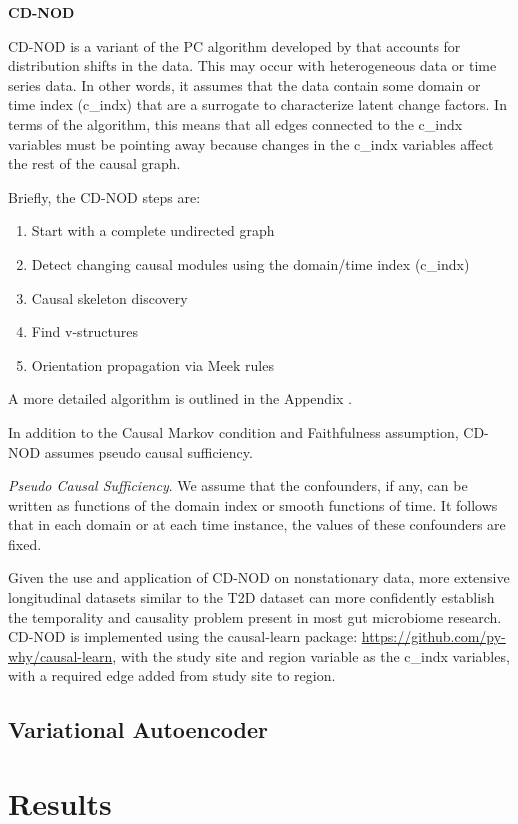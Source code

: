 \documentclass[12pt,letterpaper]{article}
\begin{document}
\textbf{CD-NOD}

CD-NOD is a variant of the PC algorithm developed by \citep{huang2019cdnod} that accounts for distribution shifts in the data. This may occur with heterogeneous data or time series data. In other words, it assumes that the data contain some domain or time index (c\_indx) that are a surrogate to characterize latent change factors. In terms of the algorithm, this means that all edges connected to the c\_indx variables must be pointing away because changes in the c\_indx variables affect the rest of the causal graph. 

Briefly, the CD-NOD steps are:
\begin{enumerate}
    \item Start with a complete undirected graph
    \item Detect changing causal modules using the domain/time index (c\_indx)
    \item Causal skeleton discovery
    \item Find v-structures
    \item Orientation propagation via Meek rules
\end{enumerate}

A more detailed algorithm is outlined in the Appendix \citep{huang2019cdnod}. 

In addition to the Causal Markov condition and Faithfulness assumption, CD-NOD assumes pseudo causal sufficiency.

\textit {Pseudo Causal Sufficiency}. We assume that the confounders, if any, can be written as functions of the domain index or smooth functions of time. It follows that in each domain or at each time instance, the values of these confounders are fixed. 

Given the use and application of CD-NOD on nonstationary data, more extensive longitudinal datasets similar to the T2D dataset can more confidently establish the temporality and causality problem present in most gut microbiome research. CD-NOD is implemented using the causal-learn package: \url{https://github.com/py-why/causal-learn}, with the study site and region variable as the c\_indx variables, with a required edge added from study site to region. 

\subsection{Variational Autoencoder}

\section{Results}
\end{document}
